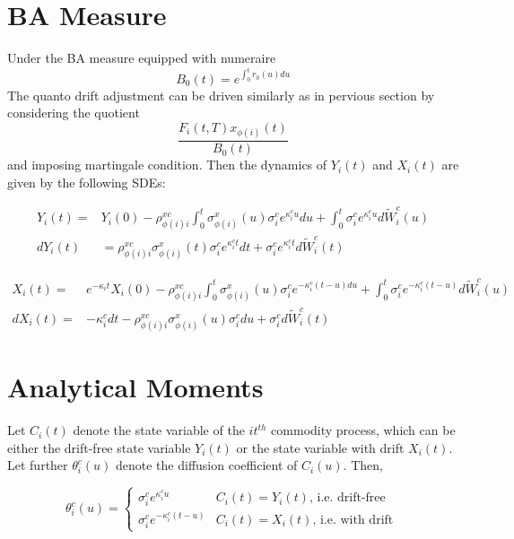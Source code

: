 \documentclass[]{article}
\begin{document}
\section{BA Measure}
%
Under the BA measure equipped with numeraire 
%
$$B_0(t) = e^{\int_0^t r_0(u) du} $$
%
The quanto drift adjustment can be driven similarly as in pervious section by considering the quotient
%
$$ \frac{F_i(t,T) x_{\phi(i)}(t) }{B_0(t)}  $$
%
and imposing martingale condition. Then the dynamics of $Y_i(t)$ and $X_i(t)$ are given by the following SDEs:
%

\begin{align}
Y_i(t) =&Y_i(0)-  \rho^{xc}_{\phi(i)i}   \int_0^t  \sigma^x_{\phi(i)}(u) \sigma^c_i e^{\kappa^c_i u} du+ \int_0^t \sigma_i^c  e^{\kappa^c_i u} d\widetilde W_i^c(u)\nonumber \\
dY_i(t) &= \rho^{xc}_{\phi(i)i}   \sigma^x_{\phi(i)}(t) \sigma^c_i e^{\kappa^c_i t} dt
+  \sigma_i^c  e^{\kappa^c_i t} d\widetilde W_i^c(t)\nonumber 
\end{align}

%
\begin{align}
X_i(t) =&  e^{-\kappa_i t}X_i(0) - \rho^{xc}_{\phi(i)i}   \int_0^t  \sigma^x_{\phi(i)}(u) \sigma^c_i e^{-\kappa^c_i (t-u) du} + \int_0^t \sigma_i^c  e^{-\kappa^c_i (t-u)} d\widetilde W_i^c(u)\nonumber \\
dX_i(t) =& -\kappa^c_i dt - \rho^{xc}_{\phi(i)i}  \sigma^x_{\phi(i)}(u) \sigma^c_i du+  \sigma_i^c  d\widetilde W_i^c(t)\nonumber 
\end{align}

\section{Analytical Moments}%
%
Let $C_i(t)$ denote the state variable of the $it^{th}$ commodity process, which can be either the drift-free state variable $Y_i(t)$ or the state variable with drift $X_i(t)$. Let further $\theta^c_i(u)$ denote the diffusion coefficient of $C_i(u)$. Then,

$$
\theta^c_i (u)= 
 \left\{ 
    \begin{array}{cc}
      \sigma^c_i e^{\kappa^c_i u}  & \text{$C_i(t) = Y_i(t)$, i.e. drift-free} \\
      \sigma^c_i e^{-\kappa^c_i (t-u)} &\text{$C_i(t) = X_i(t)$, i.e. with drift} \
    \end{array}
    \right.
$$
\end{document}
